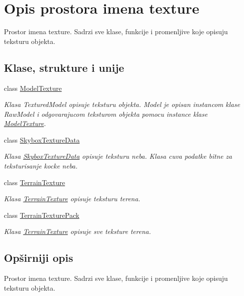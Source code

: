 \hypertarget{namespacetexture}{}\section{Opis prostora imena texture}
\label{namespacetexture}


Prostor imena texture. Sadrzi sve klase, funkcije i promenljive koje opisuju teksturu objekta.  


\subsection*{Klase, strukture i unije}
\begin{DoxyCompactItemize}
\item 
class \hyperlink{classtexture_1_1ModelTexture}{Model\+Texture}
\begin{DoxyCompactList}\small\item\em Klasa Textured\+Model opisuje teksturu objekta. Model je opisan instancom klase Raw\+Model i odgovarajucom teksturom objekta pomocu instance klase \hyperlink{classtexture_1_1ModelTexture}{Model\+Texture}. \end{DoxyCompactList}\item 
class \hyperlink{classtexture_1_1SkyboxTextureData}{Skybox\+Texture\+Data}
\begin{DoxyCompactList}\small\item\em Klasa \hyperlink{classtexture_1_1SkyboxTextureData}{Skybox\+Texture\+Data} opisuje teksturu neba. Klasa cuva podatke bitne za teksturisanje kocke neba. \end{DoxyCompactList}\item 
class \hyperlink{classtexture_1_1TerrainTexture}{Terrain\+Texture}
\begin{DoxyCompactList}\small\item\em Klasa \hyperlink{classtexture_1_1TerrainTexture}{Terrain\+Texture} opisuje teksturu terena. \end{DoxyCompactList}\item 
class \hyperlink{classtexture_1_1TerrainTexturePack}{Terrain\+Texture\+Pack}
\begin{DoxyCompactList}\small\item\em Klasa \hyperlink{classtexture_1_1TerrainTexture}{Terrain\+Texture} opisuje sve teksture terena. \end{DoxyCompactList}\end{DoxyCompactItemize}


\subsection{Opširniji opis}
Prostor imena texture. Sadrzi sve klase, funkcije i promenljive koje opisuju teksturu objekta. 
